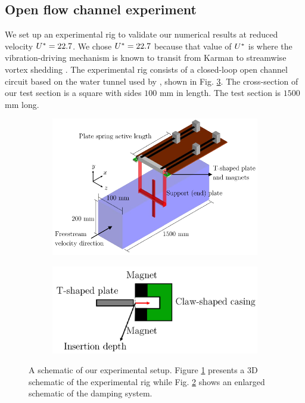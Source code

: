\documentclass[a4paper,fleqn]{cas-sc}
\begin{document}
\subsection{Open flow channel experiment} \label{ssec:openFlowExp}
We set up an experimental rig to validate our numerical results at reduced velocity $U^{*} = 22.7$. We chose $U^{*} = 22.7$ because that value of $U^{*}$ is where the vibration-driving mechanism is known to transit from Karman to streamwise vortex shedding \citep{Koide2013}. The experimental rig consists of a closed-loop open channel circuit based on the water tunnel used by \citet{Nguyen2012}, shown in Fig. \ref{fig:experimentalSetup}. The cross-section of our test section is a square with sides $100$ mm in length. The test section is $1500$ mm long.

\begin{figure}
  \centering
  \begin{subfigure}[h]{0.5\textwidth}
    \includegraphics[width=\textwidth]{figs/figure3a}
    \caption{}
    \label{fig:rigSketch}
  \end{subfigure}

  \begin{subfigure}[h]{0.35\textwidth}
    \includegraphics[width=\textwidth]{figs/figure3b}
    \caption{}
    \label{fig:damperSketch}
  \end{subfigure}

  \caption{A schematic of our experimental setup. Figure \ref{fig:rigSketch} presents a 3D schematic of the experimental rig while Fig. \ref{fig:damperSketch} shows an enlarged schematic of the damping system.} \label{fig:experimentalSetup}
\end{figure}
\end{document}

